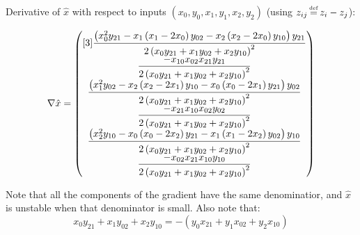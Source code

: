 
Derivative of $\hat{x}$ with respect to inputs
$(x_0,y_0,x_1,y_1,x_2,y_2)$
(using $z_{ij} \operatorname*{\overset{\underset{\mathrm{def}}{}}{=}} z_i - z_j$):

\begin{equation}
\nabla \hat{x} =
\begin{pmatrix}[3]
\dfrac{
\left(
x_0^2 y_{21}
-
x_1 \left( x_1 - 2 x_0 \right) y_{02}
- 
x_2 \left( x_2 - 2 x_0 \right) y_{10}
\right)
y_{21}
}{ %
2 \left( x_0 y_{21} + x_1 y_{02} + x_2 y_{10} \right)^{2}
} 
\\ %
\dfrac{
- x_{10} x_{02} x_{21} y_{21}
}{
2 \left( x_0 y_{21} + x_1 y_{02} + x_2 y_{10} \right)^{2}
} 
\\  %
\dfrac{
\left(
x_1^2 y_{02}
-
x_2 \left( x_2 - 2 x_1 \right) y_{10}
- 
x_0 \left( x_0 - 2 x_1 \right) y_{21}
\right)
y_{02}
}{ %
2 \left( x_0 y_{21} + x_1 y_{02} + x_2 y_{10} \right)^{2}
}
\\ %
\dfrac{
- x_{21} x_{10} x_{02} y_{02}
}{ %
2 \left( x_0 y_{21} + x_1 y_{02} + x_2 y_{10} \right)^{2}
} 
\\ %
\dfrac{
\left(
x_2^2 y_{10}
-
x_0 \left( x_0 - 2 x_2 \right) y_{21}
- 
x_1 \left( x_1 - 2 x_2 \right) y_{02}
\right)
y_{10}
}{ %
2 \left( x_0 y_{21} + x_1 y_{02} + x_2 y_{10} \right)^{2}
}
\\ %
\dfrac{
- x_{02} x_{21} x_{10} y_{10}
}{ %
2 \left( x_0 y_{21} + x_1 y_{02} + x_2 y_{10} \right)^{2}
}
\end{pmatrix}
\end{equation}

Note that all the components of the gradient have the same 
denominatior, and
$\hat{x}$ is unstable when that denominator is small.
Also note that:
\begin{equation}
x_0 y_{21} + x_1 y_{02} + x_2 y_{10}
=
- \left(
y_0 x_{21} + y_1 x_{02} + y_2 x_{10}
\right)
\end{equation}


% 

